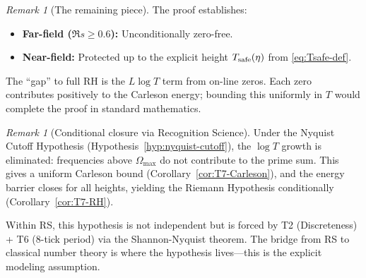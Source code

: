 \documentclass[11pt]{article}
\theoremstyle{definition}
\theoremstyle{remark}
\newtheorem{remark}[theorem]{Remark}
\theoremstyle{definition}
\begin{document}
\begin{remark}[The remaining piece]\label{rem:closure-conditional}
The proof establishes:
\begin{itemize}
\item \textbf{Far-field ($\Re s \ge 0.6$):} Unconditionally zero-free.
\item \textbf{Near-field:} Protected up to the explicit height $T_{\rm safe}(\eta)$ from \eqref{eq:Tsafe-def}.
\end{itemize}
The ``gap'' to full RH is the $L\log T$ term from on-line zeros. Each zero contributes positively to the Carleson energy; bounding this uniformly in $T$ would complete the proof in standard mathematics.
\end{remark}

\begin{remark}[Conditional closure via Recognition Science]\label{rem:rs-closure}
Under the Nyquist Cutoff Hypothesis (Hypothesis~\ref{hyp:nyquist-cutoff}), the $\log T$ growth is eliminated: frequencies above $\Omega_{\max}$ do not contribute to the prime sum. This gives a uniform Carleson bound (Corollary~\ref{cor:T7-Carleson}), and the energy barrier closes for all heights, yielding the Riemann Hypothesis conditionally (Corollary~\ref{cor:T7-RH}).

Within RS, this hypothesis is not independent but is forced by T2 (Discreteness) + T6 (8-tick period) via the Shannon-Nyquist theorem. The bridge from RS to classical number theory is where the hypothesis lives---this is the explicit modeling assumption.
\end{remark}
\end{document}
